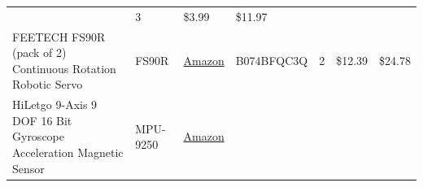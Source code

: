 \documentclass[]{article}
\begin{document}
\begin{longtable}[]{@{}lllllll@{}}
\begin{minipage}[t]{0.17\columnwidth}
\end{minipage} & \begin{minipage}[t]{0.11\columnwidth}\raggedright
3\strut
\end{minipage} & \begin{minipage}[t]{0.06\columnwidth}\raggedright
\$3.99\strut
\end{minipage} & \begin{minipage}[t]{0.07\columnwidth}\raggedright
\$11.97\strut
\end{minipage}\tabularnewline
\begin{minipage}[t]{0.15\columnwidth}\raggedright
FEETECH FS90R (pack of 2) Continuous Rotation Robotic Servo\strut
\end{minipage} & \begin{minipage}[t]{0.15\columnwidth}\raggedright
FS90R\strut
\end{minipage} & \begin{minipage}[t]{0.10\columnwidth}\raggedright
\href{https://www.amazon.com/gp/product/B074BFQC3Q/ref=oh_aui_detailpage_o06_s00?ie=UTF8\&psc=1}{Amazon}\strut
\end{minipage} & \begin{minipage}[t]{0.17\columnwidth}\raggedright
B074BFQC3Q\strut
\end{minipage} & \begin{minipage}[t]{0.11\columnwidth}\raggedright
2\strut
\end{minipage} & \begin{minipage}[t]{0.06\columnwidth}\raggedright
\$12.39\strut
\end{minipage} & \begin{minipage}[t]{0.07\columnwidth}\raggedright
\$24.78\strut
\end{minipage}\tabularnewline
\begin{minipage}[t]{0.15\columnwidth}\raggedright
HiLetgo 9-Axis 9 DOF 16 Bit Gyroscope Acceleration Magnetic Sensor\strut
\end{minipage} & \begin{minipage}[t]{0.15\columnwidth}\raggedright
MPU-9250\strut
\end{minipage} & \begin{minipage}[t]{0.10\columnwidth}\raggedright
\href{https://www.amazon.com/HiLetgo-Gyroscope-Acceleration-Accelerator-Magnetometer/dp/B01I1J0Z7Y/ref=redir_mobile_desktop?_encoding=UTF8\&dpID=51nl2fcMh6L\&dpPl=1\&keywords=mpu\%209250\&pi=AC_SX236_SY340_QL65\&qid=1512564044\&ref=plSrch\&ref_=mp_s_a_1_3\&sr=8-3}{Amazon}\strut
\end{minipage} & \begin{minipage}[t]{0.17\columnwidth}\raggedright

\end{minipage}
\end{longtable}
\end{document}

